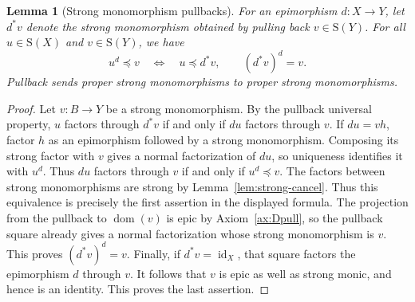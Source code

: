 \documentclass[11pt,a4paper]{article}
\theoremstyle{plain}
\newtheorem{lemma}[theorem]{Lemma}
\theoremstyle{definition}
\theoremstyle{remark}
\newcommand{\id}{\operatorname{id}}
\newcommand{\dom}{\operatorname{dom}}
\newcommand{\Occ}{\mathrm{S}}
\newcommand{\inside}{\mathrel{\preceq}}
\begin{document}
\begin{lemma}[Strong monomorphism pullbacks]\label{lem:strongpullbacks}
For an epimorphism $d:X\to Y$, let $d^*v$ denote the strong
monomorphism obtained by pulling back $v\in\Occ(Y)$. For all
$u\in\Occ(X)$ and $v\in\Occ(Y)$, we have
\[
u^d\inside v\quad\Longleftrightarrow\quad u\inside d^*v,
 \qquad (d^*v)^d=v.
\]
Pullback sends proper strong monomorphisms to proper strong monomorphisms.
\end{lemma}
\begin{proof}
Let $v:B\to Y$ be a strong monomorphism. By the pullback universal
property, $u$ factors through $d^*v$ if and only if $du$ factors
through $v$. If $du=vh$, factor $h$ as an epimorphism followed by a
strong monomorphism. Composing its strong factor with $v$ gives a
normal factorization of $du$, so uniqueness identifies it with $u^d$.
Thus $du$ factors through $v$ if and only if $u^d\inside v$.
The factors between strong monomorphisms are strong by
Lemma~\ref{lem:strong-cancel}. Thus this equivalence is precisely
the first assertion in the displayed formula. The projection from
the pullback to $\dom(v)$ is epic by Axiom~\ref{ax:Dpull}, so
the pullback square already gives a normal factorization whose
strong monomorphism is $v$. This proves $(d^*v)^d=v$.
Finally, if $d^*v=\id_X$, that square factors the epimorphism
$d$ through $v$. It follows that $v$ is epic as well as strong
monic, and hence is an identity. This proves the last assertion.
\end{proof}
\end{document}
